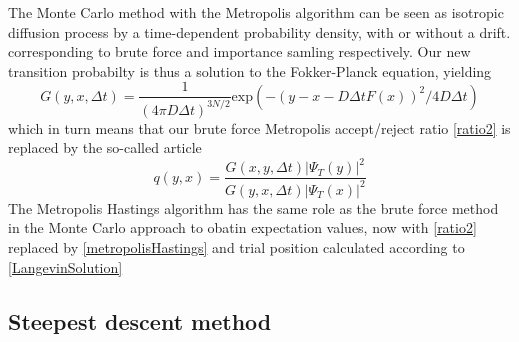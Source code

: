 \documentclass[english, a4paper]{article}
\begin{document}
\noindent The Monte Carlo method with the Metropolis algorithm can be seen as isotropic diffusion process by a time-dependent 
probability density, with or without a drift. corresponding to brute force and importance samling respectively.
Our new transition probabilty is thus a solution to the Fokker-Planck equation, yielding
\begin{equation}
 G(y, x, \Delta t) = \frac{1}{(4\pi D \Delta t)^{3N/2}}
 \textrm{exp}(-(y - x - D\Delta t F(x))^2 / 4D\Delta t)
\end{equation}
which in turn means that our brute force Metropolis accept/reject ratio \eqref{ratio2} is replaced by
the so-called  article
\begin{equation}
 q(y, x) = \frac{G(x, y, \Delta t)|\Psi_T(y)|^2}{G(y, x, \Delta t)|\Psi_T(x)|^2}
 \label{metropolisHastings}
\end{equation}
The Metropolis Hastings algorithm has the same role as the brute force method in the Monte Carlo approach
to obatin expectation values, now with \eqref{ratio2} replaced by \eqref{metropolisHastings} and trial position
calculated according to \eqref{LangevinSolution}

\subsection{Steepest descent method}
\end{document}

